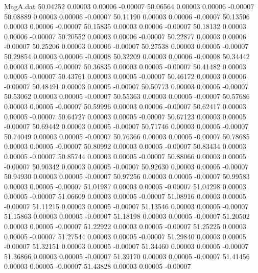 \begin{filecontents}{MagA.dat}
  50.04252    0.00003    0.00006   -0.00007
  50.06564    0.00003    0.00006   -0.00007
  50.08889    0.00003    0.00006   -0.00007
  50.11190    0.00003    0.00006   -0.00007
  50.13506    0.00003    0.00006   -0.00007
  50.15835    0.00003    0.00006   -0.00007
  50.18132    0.00003    0.00006   -0.00007
  50.20552    0.00003    0.00006   -0.00007
  50.22877    0.00003    0.00006   -0.00007
  50.25206    0.00003    0.00006   -0.00007
  50.27538    0.00003    0.00005   -0.00007
  50.29854    0.00003    0.00006   -0.00008
  50.32209    0.00003    0.00006   -0.00008
  50.34442    0.00003    0.00005   -0.00007
  50.36835    0.00003    0.00005   -0.00007
  50.41482    0.00003    0.00005   -0.00007
  50.43761    0.00003    0.00005   -0.00007
  50.46172    0.00003    0.00006   -0.00007
  50.48491    0.00003    0.00005   -0.00007
  50.50773    0.00003    0.00005   -0.00007
  50.53062    0.00003    0.00005   -0.00007
  50.55363    0.00003    0.00005   -0.00007
  50.57686    0.00003    0.00005   -0.00007
  50.59996    0.00003    0.00006   -0.00007
  50.62417    0.00003    0.00005   -0.00007
  50.64727    0.00003    0.00005   -0.00007
  50.67123    0.00003    0.00005   -0.00007
  50.69442    0.00003    0.00005   -0.00007
  50.71746    0.00003    0.00005   -0.00007
  50.74049    0.00003    0.00005   -0.00007
  50.76366    0.00003    0.00005   -0.00007
  50.78685    0.00003    0.00005   -0.00007
  50.80992    0.00003    0.00005   -0.00007
  50.83434    0.00003    0.00005   -0.00007
  50.85744    0.00003    0.00005   -0.00007
  50.88066    0.00003    0.00005   -0.00007
  50.90342    0.00003    0.00005   -0.00007
  50.92630    0.00003    0.00005   -0.00007
  50.94930    0.00003    0.00005   -0.00007
  50.97256    0.00003    0.00005   -0.00007
  50.99583    0.00003    0.00005   -0.00007
  51.01987    0.00003    0.00005   -0.00007
  51.04298    0.00003    0.00005   -0.00007
  51.06609    0.00003    0.00005   -0.00007
  51.08916    0.00003    0.00005   -0.00007
  51.11215    0.00003    0.00005   -0.00007
  51.13546    0.00003    0.00005   -0.00007
  51.15863    0.00003    0.00005   -0.00007
  51.18198    0.00003    0.00005   -0.00007
  51.20502    0.00003    0.00005   -0.00007
  51.22922    0.00003    0.00005   -0.00007
  51.25225    0.00003    0.00005   -0.00007
  51.27544    0.00003    0.00005   -0.00007
  51.29840    0.00003    0.00005   -0.00007
  51.32151    0.00003    0.00005   -0.00007
  51.34460    0.00003    0.00005   -0.00007
  51.36866    0.00003    0.00005   -0.00007
  51.39170    0.00003    0.00005   -0.00007
  51.41456    0.00003    0.00005   -0.00007
  51.43828    0.00003    0.00005   -0.00007

\end{filecontents}
